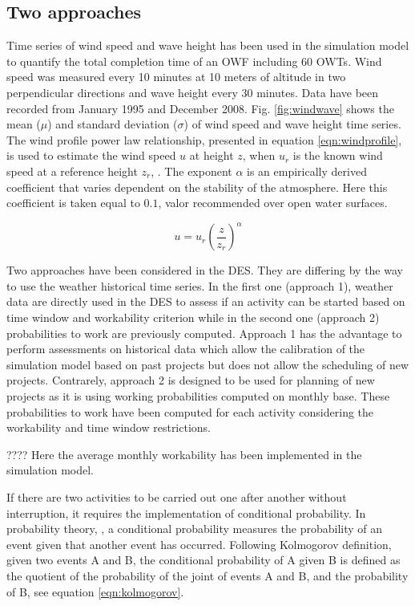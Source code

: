 \subsection{Two approaches}
Time series of wind speed and wave height has been used in the simulation model to quantify the total completion time of an OWF including 60 OWTs. Wind speed was measured every 10 minutes at 10 meters of altitude in two perpendicular directions and wave height every 30 minutes. Data have been recorded from January 1995 and December 2008.
Fig. \ref{fig:windwave} shows the mean ($\mu$) and standard deviation ($\sigma$) of wind speed and wave height time series.
The wind profile power law relationship, presented in equation \ref{eqn:windprofile}, is used to estimate the wind speed $u$ at height $z$, when $u_{r}$ is the known wind speed at a reference height $z_{r}$, \cite{1978Peterson}. The exponent $\alpha$ is an empirically derived coefficient that varies dependent on the stability of the atmosphere. Here this coefficient is taken equal to $0.1$, valor recommended over open water surfaces.

\begin{equation}
\label{eqn:windprofile}
u = u_{r} \left( \frac{z}{z_r} \right)^{\alpha}
\end{equation}

Two approaches have been considered in the DES. They are differing by the way to use the weather historical time series. In the first one (approach 1), weather data are directly used in the DES to assess if an activity can be started based on time window and workability criterion while in the second one (approach 2) probabilities to work are previously computed. Approach 1 has the advantage to perform assessments on historical data which allow the calibration of the simulation model based on past projects but does not allow the scheduling of new projects. Contrarely, approach 2 is designed to be used for planning of new projects as it is using working probabilities computed on monthly base. These probabilities to work have been computed for each activity considering the workability and time window restrictions.

???? Here the average monthly workability has been implemented in the simulation model. 

If there are two activities to be carried out one after another without interruption, it requires the implementation of conditional probability.  
In probability theory, \cite{Thalemann2012}, a conditional probability measures the probability of an event given that another event has occurred. Following Kolmogorov definition, given two events A and B, the conditional probability of A given B is defined as the quotient of the probability of the joint of events A and B, and the probability of B, see equation \ref{eqn:kolmogorov}.


